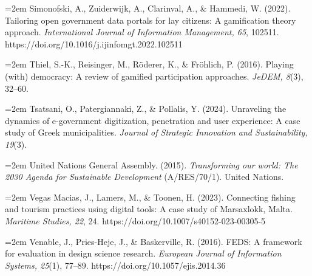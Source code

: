 \documentclass[11pt,a4paper]{article}
\newcommand{\refitem}[1]{\noindent\hangindent=2em\hangafter=1 #1\par\smallskip}
\begin{document}
\refitem{Simonofski, A., Zuiderwijk, A., Clarinval, A., \& Hammedi, W. (2022). Tailoring open government data portals for lay citizens: A gamification theory approach. \emph{International Journal of Information Management, 65}, 102511. https://doi.org/10.1016/j.ijinfomgt.2022.102511}
\refitem{Thiel, S.-K., Reisinger, M., R\"oderer, K., \& Fr\"ohlich, P. (2016). Playing (with) democracy: A review of gamified participation approaches. \emph{JeDEM, 8}(3), 32--60.}
\refitem{Tsatsani, O., Patergiannaki, Z., \& Pollalis, Y. (2024). Unraveling the dynamics of e-government digitization, penetration and user experience: A case study of Greek municipalities. \emph{Journal of Strategic Innovation and Sustainability, 19}(3).}
\refitem{United Nations General Assembly. (2015). \emph{Transforming our world: The 2030 Agenda for Sustainable Development} (A/RES/70/1). United Nations.}
\refitem{Vegas Macias, J., Lamers, M., \& Toonen, H. (2023). Connecting fishing and tourism practices using digital tools: A case study of Marsaxlokk, Malta. \emph{Maritime Studies, 22}, 24. https://doi.org/10.1007/s40152-023-00305-5}
\refitem{Venable, J., Pries-Heje, J., \& Baskerville, R. (2016). FEDS: A framework for evaluation in design science research. \emph{European Journal of Information Systems, 25}(1), 77--89. https://doi.org/10.1057/ejis.2014.36}
\end{document}
